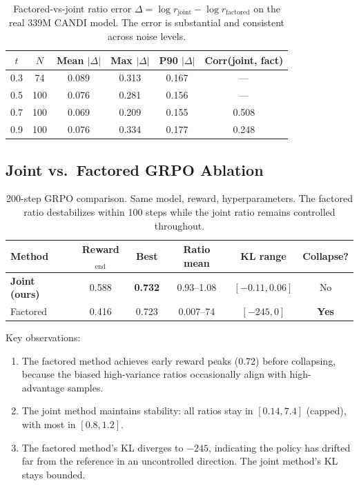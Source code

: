 \documentclass{article}
\begin{document}
\begin{table}[h]
\centering
\begin{tabular}{cccccc}
\toprule
$t$ & $N$ & Mean $|\Delta|$ & Max $|\Delta|$ & P90 $|\Delta|$ & Corr(joint, fact) \\
\midrule
0.3 & 74 & 0.089 & 0.313 & 0.167 & --- \\
0.5 & 100 & 0.076 & 0.281 & 0.156 & --- \\
0.7 & 100 & 0.069 & 0.209 & 0.155 & 0.508 \\
0.9 & 100 & 0.076 & 0.334 & 0.177 & 0.248 \\
\bottomrule
\end{tabular}
\caption{Factored-vs-joint ratio error $\Delta = \log r_\text{joint} - \log r_\text{factored}$ on the real 339M CANDI model. The error is substantial and consistent across noise levels.}
\end{table}

\subsection{Joint vs.\ Factored GRPO Ablation}

\begin{table}[h]
\centering
\begin{tabular}{lccccc}
\toprule
Method & Reward$_\text{end}$ & Best & Ratio mean & KL range & Collapse? \\
\midrule
\textbf{Joint (ours)} & 0.588 & \textbf{0.732} & 0.93--1.08 & $[-0.11, 0.06]$ & No \\
Factored & 0.416 & 0.723 & 0.007--74 & $[-245, 0]$ & \textbf{Yes} \\
\bottomrule
\end{tabular}
\caption{200-step GRPO comparison. Same model, reward, hyperparameters. The factored ratio destabilizes within 100 steps while the joint ratio remains controlled throughout.}
\end{table}

Key observations:
\begin{enumerate}
\item The factored method achieves early reward peaks (0.72) before collapsing, because the biased high-variance ratios occasionally align with high-advantage samples.
\item The joint method maintains stability: all ratios stay in $[0.14, 7.4]$ (capped), with most in $[0.8, 1.2]$.
\item The factored method's KL diverges to $-245$, indicating the policy has drifted far from the reference in an uncontrolled direction. The joint method's KL stays bounded.
\end{enumerate}
\end{document}
